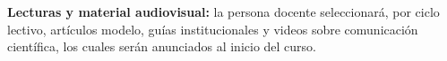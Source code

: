 \begin{refsection}
\nocite{Hig98}
\nocite{KLR89}
\nocite{Lam94}
\nocite{Kra17}
\nocite{CGS-RCR}
\nocite{AMS-authors}
\nocite{MAA-resources}

\printcursosbibliography

\textbf{Lecturas y material audiovisual:} la persona docente seleccionará, por ciclo lectivo, artículos modelo, guías institucionales y videos sobre comunicación científica, los cuales serán anunciados al inicio del curso.

\end{refsection}
